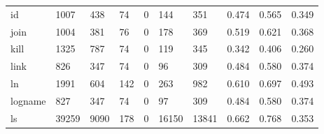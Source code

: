 \begin{longtable}{lp{1.3cm}p{1.3cm}p{1.3cm}p{1.3cm}p{1.3cm}p{1.3cm}p{1.3cm}p{1.3cm}p{1.3cm}}
id        &                   1007 &                                438 &                                74 &                                0 &                               144 &                             351 &                                   0.474 &                                  0.565 &                                0.349 \\
join      &                   1004 &                                381 &                                76 &                                0 &                               178 &                             369 &                                   0.519 &                                  0.621 &                                0.368 \\
kill      &                   1325 &                                787 &                                74 &                                0 &                               119 &                             345 &                                   0.342 &                                  0.406 &                                0.260 \\
link      &                    826 &                                347 &                                74 &                                0 &                                96 &                             309 &                                   0.484 &                                  0.580 &                                0.374 \\
ln        &                   1991 &                                604 &                               142 &                                0 &                               263 &                             982 &                                   0.610 &                                  0.697 &                                0.493 \\
logname   &                    827 &                                347 &                                74 &                                0 &                                97 &                             309 &                                   0.484 &                                  0.580 &                                0.374 \\
ls        &                  39259 &                               9090 &                               178 &                                0 &                             16150 &                           13841 &                                   0.662 &                                  0.768 &                                0.353 \\

\end{longtable}
